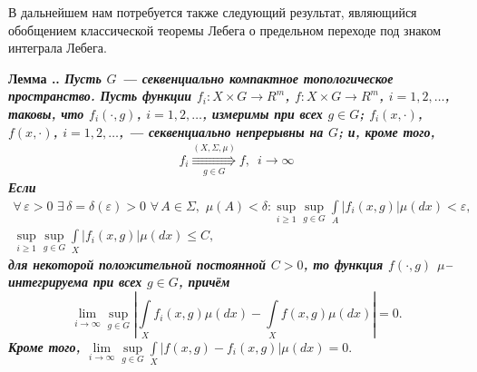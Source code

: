\documentclass{report}
\newcounter{lem}[section]
\renewcommand{\thelem}{\thesection.\arabic{lem}}
\newenvironment{Lemma}{\par\refstepcounter{lem}\bf Лемма \thelem. \it}{\rm\par}
\newcommand{\ByMeasureUniformly}{\mathop{\Rrightarrow}}
\begin{document}
В дальнейшем нам потребуется также следующий результат, являющийся обобщением классической теоремы Лебега о предельном переходе под знаком интеграла Лебега.
\begin{Lemma}\label{mLebesgue:uniform} Пусть $G$ --- секвенциально компактное топологическое пространство. Пусть функции $f_i\colon X\times G\to R^m$, $f\colon X\times G\to R^m$,
$i=1,2,\dots$, таковы, что $f_i(\cdot,g)$, $i=1,2,\dots$, измеримы при всех $g\in G$; $f_i(x,\cdot)$, $f(x,\cdot)$, $i=1,2,\dots$, --- секвенциально непрерывны на $G$; и, кроме того,
\begin{gather*}
f_i\ByMeasureUniformly\limits_{g\in G}^{(X,\Sigma,\mu)}f,\,\,\,i\to\infty
\end{gather*}
Если
\begin{gather}
\label{mLebesgue:uniform:ravnomero_absolyutno_nepr} \forall\,\varepsilon>0\,\,\exists\,\delta=\delta(\varepsilon)>0\,\,\forall\,A\in\Sigma,\,\,\mu(A)<\delta:
\sup\limits_{i\geqslant1}\sup\limits_{g\in G}\int\limits_A|f_i(x,g)|\mu(dx)<\varepsilon,\\
\label{boundness_in_L_1(X,Sigma,mu)} \sup\limits_{i\geqslant1}\sup\limits_{g\in G}\int\limits_X|f_i(x,g)|\mu(dx)\leqslant C,
\end{gather}
для некоторой положительной постоянной $C>0$, то функция $f(\cdot,g)$ $\mu$--интегрируема при всех $g\in G$, причём
\begin{equation}\label{mLebesgueLIM:uniform}
\lim\limits_{i\to\infty}\sup\limits_{g\in G}\left|\int\limits_Xf_i(x,g)\mu(dx)-\int\limits_Xf(x,g)\mu(dx)\right|=0.
\end{equation}
Кроме того, $\lim\limits_{i\to\infty}\sup\limits_{g\in G}\int\limits_X|f(x,g)-f_i(x,g)|\mu(dx)=0.$
\end{Lemma}
\end{document}
